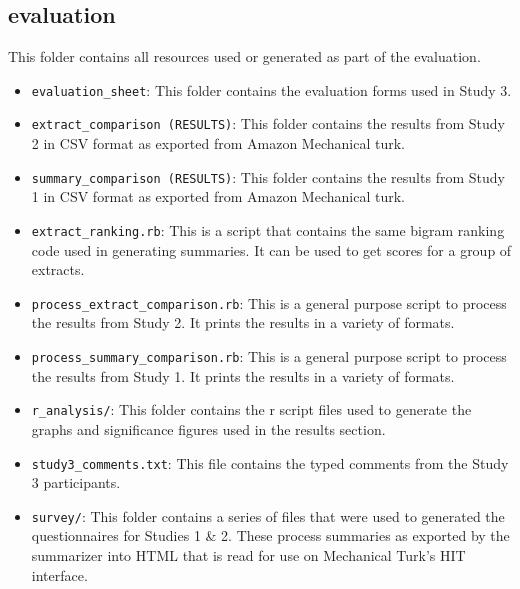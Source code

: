 \subsection*{evaluation}
  This folder contains all resources used or generated as part of the evaluation.
  \begin{itemize}
    \item
      \texttt{evaluation\_sheet}: This folder contains the evaluation forms used in Study 3.
    \item
      \texttt{extract\_comparison\ (RESULTS)}: This folder contains the results from Study 2 in CSV format as exported from Amazon Mechanical turk.
    \item
      \texttt{summary\_comparison\ (RESULTS)}: This folder contains the results from Study 1 in CSV format as exported from Amazon Mechanical turk.
    \item
      \texttt{extract\_ranking.rb}: This is a script that contains the same bigram ranking code used in generating summaries. It can be used to get scores for a group of extracts.
    \item
      \texttt{process\_extract\_comparison.rb}: This is a general purpose script to process the results from Study 2. It prints the results in a variety of formats.
    \item
      \texttt{process\_summary\_comparison.rb}: This is a general purpose script to process the results from Study 1. It prints the results in a variety of formats.
    \item
      \texttt{r\_analysis/}: This folder contains the r script files used to generate the graphs and significance figures used in the results section.
    \item
      \texttt{study3\_comments.txt}: This file contains the typed comments from the Study 3 participants.
    \item
      \texttt{survey/}: This folder contains a series of files that were used to generated the questionnaires for Studies 1 \& 2. These process summaries as exported by the summarizer into HTML that is read for use on Mechanical Turk's HIT interface.
  \end{itemize}

